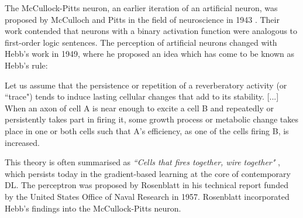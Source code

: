 The McCullock-Pitts neuron, an earlier iteration of an artificial neuron, was
proposed by McCulloch and Pitts in the field of neuroscience in 1943
\cite{McCulloch1943}. Their work contended that neurons with a binary activation
function were analogous to first-order logic sentences. The perception of
artificial neurons changed with Hebb's work in 1949, where he proposed an idea
which has come to be known as Hebb's rule:

\begin{fancyquotes}
    Let us assume that the persistence or repetition of a reverberatory activity
    (or ``trace") tends to induce lasting cellular changes that add to its
    stability. [...] When an axon of cell A is near enough to excite a cell B
    and repeatedly or persistently takes part in firing it, some growth process
    or metabolic change takes place in one or both cells such that A’s
    efficiency, as one of the cells firing B, is increased. \cite{10.1007/978-3-642-70911-1_15}
\end{fancyquotes}

This theory is often summarised as \textit{``Cells that fires together, wire
together"} \cite{doi:10.1126/science.7912852}, which persists today in the
gradient-based learning at the core of contemporary \gls{DL}. The perceptron was
proposed by Rosenblatt \cite{Rosenblatt_1957_6098} in his technical report
funded by the United States Office of Naval Research
\cite{doi:10.1177/030631296026003005} in 1957. Rosenblatt incorporated Hebb's
findings into the McCullock-Pitts neuron.

